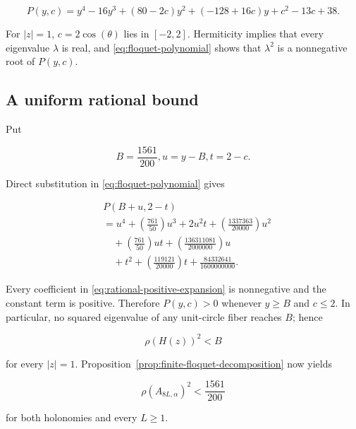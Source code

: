 \begin{equation}
\label{eq:floquet-polynomial}
P(y,c)=y^{4}-16y^{3}+(80-2c)y^{2}+(-128+16c)y+c^{2}-13c+38.
\end{equation}

For \(\lvert z\rvert=1\), \(c=2\cos(\theta)\) lies in \([-2,2]\). Hermiticity implies that every
eigenvalue \(\lambda\) is real, and \eqref{eq:floquet-polynomial} shows that \(\lambda^{2}\) is a nonnegative
root of \(P(y,c)\).

\subsection{A uniform rational bound}

Put

\begin{equation}
B=\frac{1561}{200},       u=y-B,       t=2-c.
\end{equation}

Direct substitution in \eqref{eq:floquet-polynomial} gives

\begin{equation}
\label{eq:rational-positive-expansion}
\begin{aligned}
&P(B+u,2-t) \\
&=u^{4}+(\frac{761}{50})u^{3}+2u^{2}t+(\frac{1337363}{20000})u^{2} \\
&\quad +(\frac{761}{50})ut+(\frac{136311081}{2000000})u \\
&\quad +t^{2}+(\frac{119121}{20000})t+\frac{84332641}{1600000000}.
\end{aligned}
\end{equation}

Every coefficient in \eqref{eq:rational-positive-expansion} is nonnegative and the constant term is positive.
Therefore \(P(y,c)>0\) whenever \(y\geq B\) and \(c\leq 2\). In particular, no squared
eigenvalue of any unit-circle fiber reaches \(B\); hence

\begin{equation}
\label{eq:uniform-fiber-bound}
\rho(H(z))^{2}<B
\end{equation}

for every \(\lvert z\rvert=1\). Proposition~\ref{prop:finite-floquet-decomposition} now yields

\begin{equation}
\label{eq:finite-family-upper-bound}
\rho(A_{8L,\alpha})^{2}<\frac{1561}{200}
\end{equation}

for both holonomies and every \(L\geq 1\).

